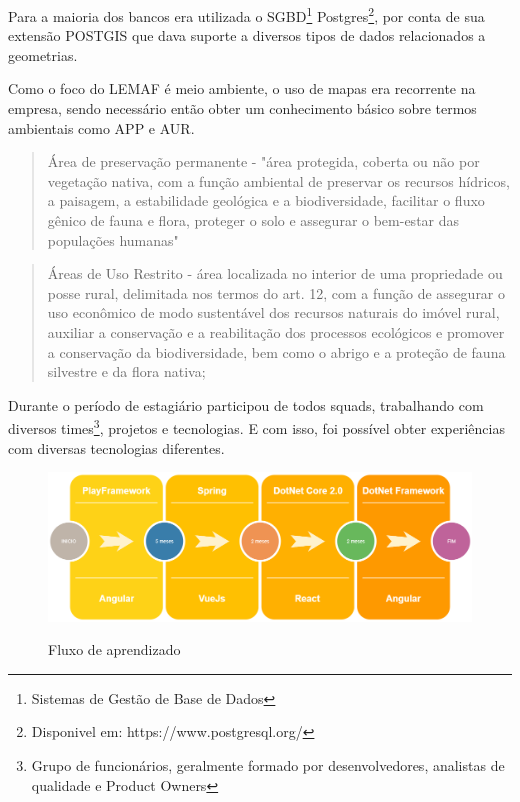 Para a maioria dos bancos era utilizada o SGBD\footnote{ Sistemas de Gestão de Base de Dados} Postgres\footnote{Disponivel em: https://www.postgresql.org/}, por conta de sua extensão POSTGIS que dava suporte a diversos tipos de dados relacionados a geometrias.

Como o foco do LEMAF é meio ambiente, o uso de mapas era recorrente na empresa, sendo necessário então obter um conhecimento básico sobre termos ambientais como APP e AUR.

\begin{quote}
    Área de preservação permanente - "área protegida, coberta ou não por vegetação nativa, com a função ambiental de preservar os recursos hídricos, a paisagem, a estabilidade geológica e a biodiversidade, facilitar o fluxo gênico de fauna e flora, proteger o solo e assegurar o bem-estar das populações humanas"\cite{brasil2012}
\end{quote}

\begin{quote}
    Áreas de Uso Restrito -  área localizada no interior de uma propriedade ou posse rural, delimitada nos termos do art. 12, com a função de assegurar o uso econômico de modo sustentável dos recursos naturais do imóvel rural, auxiliar a conservação e a reabilitação dos processos ecológicos e promover a conservação da biodiversidade, bem como o abrigo e a proteção de fauna silvestre e da flora nativa;
\cite{brasil2012}

\end{quote}

Durante o período de estagiário participou de todos squads, trabalhando com diversos times\footnote{Grupo de funcionários, geralmente formado por desenvolvedores, analistas de qualidade e Product Owners}, projetos e tecnologias.
E com isso, foi possível obter experiências com diversas tecnologias diferentes.
\begin{figure}[H]
\centering
\caption{Fluxo de aprendizado} %
\includegraphics[scale=0.35]{fluxoAprendizado}\\  %
\label{fig:exemplo} %
\end{figure}

